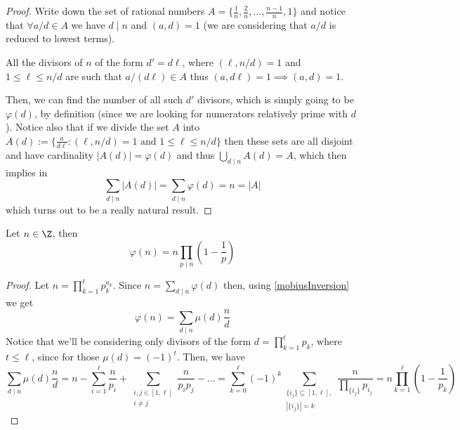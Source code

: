 \begin{proof}
    Write down the set of rational numbers \(A = \{\frac{1}{n}, \frac{2}{n},
    \dots, \frac{n-1}{n}, 1\}\) and notice that \(\forall a/d \in A\) we have \(d
    \mid n\) and \((a, d) = 1\) (we are considering that \(a/d\) is reduced to
    lowest terms).

    All the divisors of \(n\) of the form  \(d' = d \ell\), where
    \((\ell, n/d) = 1\) and \(1 \leqslant \ell \leqslant n/d\) are such that
    \(a/(d\ell) \in A\) thus \((a, d \ell) = 1 \implies (a,d) = 1\).

    Then, we can find the number of all such \(d'\) divisors, which is simply
    going to be \(\varphi(d)\), by definition (since we are looking for
    numerators relatively prime with \(d\)). Notice also that if we divide the
    set \(A\) into \(A(d) := \{\frac{a}{d\ell} : (\ell,n/d) = 1\text{ and } 1
    \leqslant \ell \leqslant n/d \}\) then these sets are all disjoint and have
    cardinality \(|A(d)| = \varphi(d)\) and thus \(\bigcup_{d \mid n} A(d) = A\),
    which then implies in
    \[
        \sum_{d \mid n} |A(d)| = \sum_{d \mid n} \varphi(d) = n = |A|
    \]
    which turns out to be a really natural result.
\end{proof}

\begin{proposition}
    Let \(n \in \Z\), then
    \[
        \varphi(n) = n \prod_{p \mid n} \left( 1 - \frac{1}{p} \right)
    \]
\end{proposition}

\begin{proof}
    Let \(n = \prod_{k = 1}^\ell p_k^{a_k}\). Since \(n = \sum_{d \mid n}
    \varphi(d)\) then, using \ref{mobiusInversion} we get
    \[
        \varphi(n) = \sum_{d \mid n} \mu(d) \frac{n}{d}
    \]
    Notice that we'll be considering only divisors of the form \(d = \prod_{k =
        1}^{t} p_k\), where \(t \leqslant \ell\), since for those \(\mu(d) =
    (-1)^t\). Then, we have
    \[
        \sum_{d \mid n} \mu(d) \frac{n}{d} =
        n - \sum_{i=1}^\ell \frac{n}{p_i} + \sum_{\substack{i,j \in [1, \ell] \\
                i\neq j}} \frac{n}{p_i p_j} - \dots
        =
        \sum_{k=0}^\ell (-1)^k \sum_{\substack{\{i_j\} \subseteq [1, \ell], \\
                |\{i_j\}| = k}} \frac{n}{\prod_{\{i_j\}} p_{i_j}}
        =
        n \prod_{k = 1}^\ell \left( 1 - \frac{1}{p_k} \right)
    \]
\end{proof}


